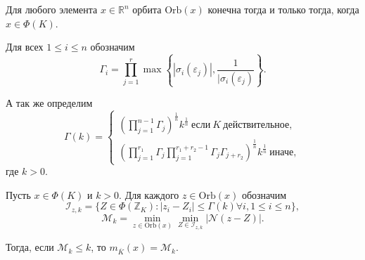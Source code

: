 \documentclass[_00_dissertation.tex]{subfiles}
\begin{document}
\begin{proposition}\cite{source:Lezowski}
    Для любого элемента $x\in \mathbb{R}^n$ орбита $\textrm{Orb}(x)$ конечна тогда и только тогда, когда $x \in \Phi(K)$.
\end{proposition}

\begin{definition}
    Для всех $1 \le i \le n$ обозначим
    \begin{equation*}
        \Gamma_i = \prod\limits_{j=1}^r \max\left\{
            |\sigma_i(\varepsilon_j)|, \frac{1}{|\sigma_i(\varepsilon_j)}
        \right\}.
    \end{equation*}

    А так же определим
    \begin{equation*}
        \Gamma(k) =
        \begin{cases}
            \left(
                \prod\limits_{j=1}^{n-1} \Gamma_j
            \right)^{\frac{1}{n}} k^{\frac{1}{n}}\ \textrm{если}\ K\ \textrm{действительное},\\
            \left(
                \prod\limits_{j=1}^{r_1} \Gamma_j \prod\limits_{j=1}^{r_1+r_2-1} \Gamma_j \Gamma_{j+r_2}
            \right)^{\frac{1}{n}} k^{\frac{1}{n}}\ \textrm{иначе},
        \end{cases}
    \end{equation*}
    где $k>0$.
\end{definition}

\begin{proposition}\label{proposition:division_with_least_norm_remainder}\cite{source:Lezowski}
    Пусть $x \in \Phi(K)$ и $k > 0$.
    Для каждого $z \in \textrm{Orb}(x)$ обозначим
    \begin{equation*}
        \mathcal{I}_{z, k} = \{Z \in \Phi(\mathbb{Z}_K): |z_i-Z_i| \le \Gamma(k) \forall i, 1 \le i \le n\},
    \end{equation*}
    \begin{equation*}
        \mathcal{M}_k = \min\limits_{z \in \textrm{Orb}(x)} \min\limits_{Z \in \mathcal{I}_{z, k}} |\mathcal{N}(z-Z)|.
    \end{equation*}

    Тогда, если $\mathcal{M}_k \le k$, то $m_{\overline{K}}(x) = \mathcal{M}_k$.
\end{proposition}
\end{document}
